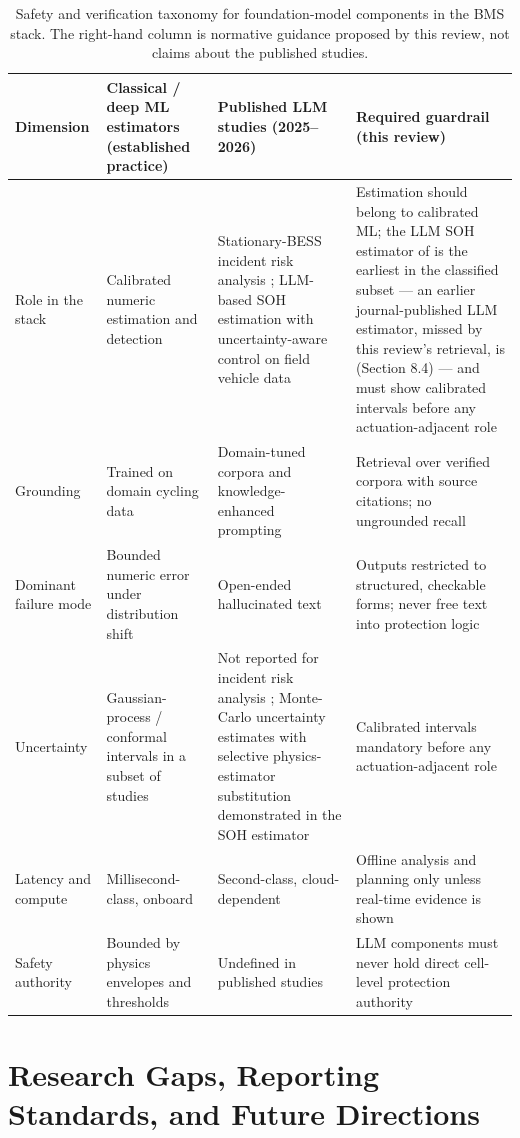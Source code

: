 \documentclass[journal]{IEEEtran}
\begin{document}
\begin{table}[!t]
\caption{Safety and verification taxonomy for foundation-model components in the BMS stack. The right-hand column is normative guidance proposed by this review, not claims about the published studies.}
\label{tab:TABLE_LLM}
\centering
\footnotesize
\begin{tabular}{|p{0.57in}|p{1.64in}|p{2.16in}|p{2.16in}|}
\hline
\textbf{Dimension} & \textbf{Classical / deep ML estimators (established practice)} & \textbf{Published LLM studies (2025--2026)} & \textbf{Required guardrail (this review)} \\
\hline
Role in the stack & Calibrated numeric estimation and detection & Stationary-BESS incident risk analysis \cite{r14}; LLM-based SOH estimation with uncertainty-aware control on field vehicle data \cite{r15} & Estimation should belong to calibrated ML; the LLM SOH estimator of \cite{r15} is the earliest in the classified subset --- an earlier journal-published LLM estimator, missed by this review's retrieval, is \cite{r29} (Section 8.4) --- and must show calibrated intervals before any actuation-adjacent role \\
Grounding & Trained on domain cycling data & Domain-tuned corpora and knowledge-enhanced prompting & Retrieval over verified corpora with source citations; no ungrounded recall \\
Dominant failure mode & Bounded numeric error under distribution shift & Open-ended hallucinated text & Outputs restricted to structured, checkable forms; never free text into protection logic \\
Uncertainty & Gaussian-process / conformal intervals in a subset of studies & Not reported for incident risk analysis \cite{r14}; Monte-Carlo uncertainty estimates with selective physics-estimator substitution demonstrated in the SOH estimator \cite{r15} & Calibrated intervals mandatory before any actuation-adjacent role \\
Latency and compute & Millisecond-class, onboard & Second-class, cloud-dependent & Offline analysis and planning only unless real-time evidence is shown \\
Safety authority & Bounded by physics envelopes and thresholds & Undefined in published studies & LLM components must never hold direct cell-level protection authority \\
\hline
\end{tabular}
\end{table}

\section{Research Gaps, Reporting Standards, and Future Directions}
\end{document}
